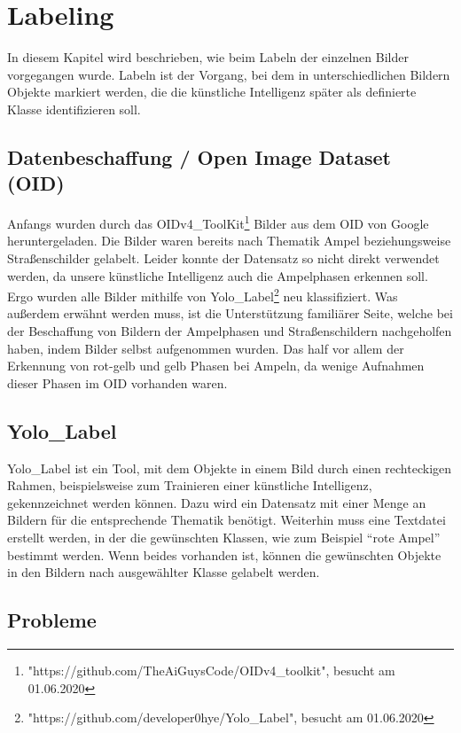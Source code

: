 \documentclass[a4paper,oneside,12pt]{report}
\begin{document}
	\chapter{Labeling}
	\begin{onehalfspace}
		In diesem Kapitel wird beschrieben, wie beim Labeln der einzelnen Bilder vorgegangen wurde. Labeln ist der Vorgang, bei dem in unterschiedlichen Bildern Objekte markiert werden, die die künstliche Intelligenz später als definierte Klasse identifizieren soll.
		\section{Datenbeschaffung / Open Image Dataset (OID)}
		Anfangs wurden durch das OIDv4\_ToolKit\footnote{"https://github.com/TheAiGuysCode/OIDv4\_toolkit", besucht am 01.06.2020} Bilder aus dem OID von Google heruntergeladen. Die Bilder waren bereits nach Thematik Ampel beziehungsweise Straßenschilder gelabelt. Leider konnte der Datensatz so nicht direkt verwendet werden, da unsere künstliche Intelligenz auch die Ampelphasen erkennen soll. Ergo wurden alle Bilder mithilfe von Yolo\_Label\footnote{"https://github.com/developer0hye/Yolo\_Label", besucht am 01.06.2020} neu klassifiziert. Was außerdem erwähnt werden muss, ist die Unterstützung familiärer Seite, welche bei der Beschaffung von Bildern der Ampelphasen und Straßenschildern nachgeholfen haben, indem Bilder selbst aufgenommen wurden. Das half vor allem der Erkennung von rot-gelb und gelb Phasen bei Ampeln, da wenige Aufnahmen dieser Phasen im OID vorhanden waren.
		\section{Yolo\_Label}
		Yolo\_Label ist ein Tool, mit dem Objekte in einem Bild durch einen rechteckigen Rahmen, beispielsweise zum Trainieren einer künstliche Intelligenz, gekennzeichnet werden können. Dazu wird ein Datensatz mit einer Menge an Bildern für die entsprechende Thematik benötigt. Weiterhin muss eine Textdatei erstellt werden, in der die gewünschten Klassen, wie zum Beispiel "`rote Ampel"' bestimmt werden. Wenn beides vorhanden ist, können die gewünschten Objekte in den Bildern nach ausgewählter Klasse gelabelt werden.
		\section{Probleme}

\end{onehalfspace}
\end{document}
